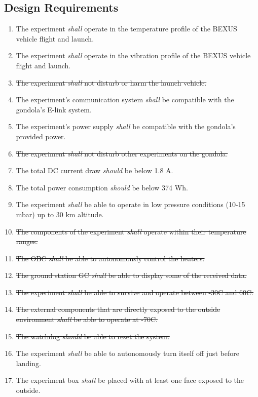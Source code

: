 \subsection{Design Requirements}

\begin{enumerate}[label=D.\arabic*]
    \item The experiment \textit{shall} operate in the temperature profile of the BEXUS vehicle flight and launch.
    \item The experiment \textit{shall} operate in the vibration profile of the BEXUS vehicle flight and launch.
    \item \st{The experiment \textit{shall} not disturb or harm the launch vehicle.}
    \item The experiment's communication system \textit{shall} be compatible with the gondola's E-link system.
    \item The experiment's power supply \textit{shall} be compatible with the gondola's provided power.
    \item \st{The experiment \textit{shall} not disturb other experiments on the gondola.}
    \item The total DC current draw \textit{should} be below 1.8 A.
    \item The total power consumption \textit{should} be below 374 Wh.
    \item The experiment \textit{shall} be able to operate in low pressure conditions (10-15 mbar) up to 30 km altitude.
    \item \st{The components of the experiment \textit{shall} operate within their temperature ranges.}
    \item \st{The OBC \textit{shall} be able to autonomously control the heaters.}
    \item \st{The ground station GC \textit{shall} be able to display some of the received data.}
    \item \st{The experiment \textit{shall} be able to survive and operate between -30\degree C and 60\degree C.}
    \item \st{The external components that are directly exposed to the outside environment \textit{shall} be able to operate at -70\degree C.}
    \item \st{The watchdog \textit{should} be able to reset the system.}
    \item The experiment \textit{shall} be able to autonomously turn itself off just before landing.
    \item The experiment box \textit{shall} be placed with at least one face exposed to the outside.

\end{enumerate}
